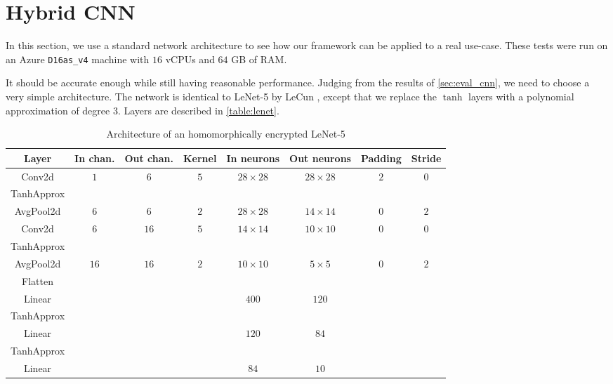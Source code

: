 \documentclass[a4paper,11pt,oneside]{report}
\begin{document}
\section{Hybrid CNN}

In this section, we use a standard network architecture to see how our framework can be applied to a real use-case. 
These tests were run on an Azure \texttt{D16as\_v4} machine with $16$ vCPUs and $64$ GB of RAM.

It should be accurate enough while still having reasonable performance.
Judging from the results of \autoref{sec:eval_cnn}, we need to choose a very simple architecture. 
The network is identical to LeNet-5 by LeCun \cite{lecun_gradient-based_1998}, except that we replace the $\tanh$ layers with a polynomial approximation of degree $3$. 
Layers are described in \autoref{table:lenet}.

\begin{table}[h!]
  \begin{center}
    \caption{Architecture of an homomorphically encrypted LeNet-5}
    \label{table:lenet}
    \begin{tabular}{ c c c c c c c c }
    \hline
    Layer & In chan. & Out chan. & Kernel & In neurons & Out neurons & Padding & Stride \\
    \hline
    Conv2d & $1$ & $6$ & $5$ & $28 \times 28$ & $28 \times 28$ & $2$ & $0$ \\
    TanhApprox & & & & & & &  \\
    AvgPool2d & $6$ & $6$ & $2$ & $28 \times 28$ & $14 \times 14$ & $0$ & $2$ \\
    Conv2d & $6$ & $16$ & $5$ & $14 \times 14$ & $10 \times 10$ & $0$ & $0$ \\
    TanhApprox & & & & & & &  \\
    AvgPool2d & $16$ & $16$ & $2$ & $10 \times 10$ & $5 \times 5$ & $0$ & $2$ \\
    Flatten \\
    Linear & & & & $400$ & $120$ & &  \\
    TanhApprox & & & & & & &  \\
    Linear & & & & $120$ & $84$ & &  \\
    TanhApprox & & & & & & &  \\
    Linear & & & & $84$ & $10$ & &  \\
    \hline
    \end{tabular}
  \end{center}
\end{table}
\end{document}
